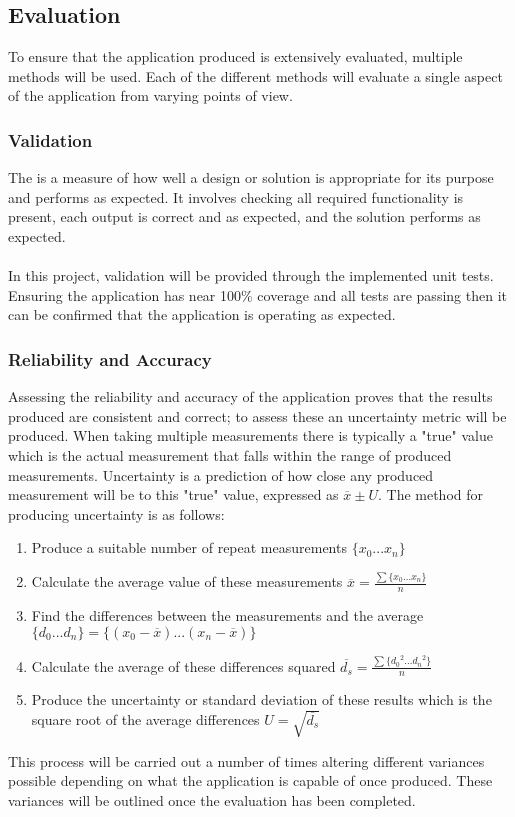 \subsection{Evaluation}
	To ensure that the application produced is extensively evaluated, multiple methods will be used. Each of the different methods will evaluate a single aspect of the application from varying points of view.
	\subsubsection{Validation}
		The is a measure of how well a design or solution is appropriate for its purpose and performs as expected. It involves checking all required functionality is present, each output is correct and as expected, and the solution performs as expected.
		\\\\
		In this project, validation will be provided through the implemented unit tests. Ensuring the application has near 100\% coverage and all tests are passing then it can be confirmed that the application is operating as expected.
	\subsubsection{Reliability and Accuracy}
		Assessing the reliability and accuracy of the application proves that the results produced are consistent and correct; to assess these an uncertainty metric will be produced. When taking multiple measurements there is typically a "true" value which is the actual measurement that falls within the range of produced measurements. Uncertainty is a prediction of how close any produced measurement will be to this "true" value, expressed as $\overline{x} \pm U$. The method for producing uncertainty is as follows:
		\begin{enumerate}
			\item Produce a suitable number of repeat measurements $\{x_0 ... x_n\}$
			\item Calculate the average value of these measurements $\overline{x}=\frac{\sum\{x_0...x_n\}}{n}$
			\item Find the differences between the measurements and the average $\{d_0...d_n\} = \{(x_0-\overline{x})...(x_n-\overline{x})\}$
			\item Calculate the average of these differences squared $\overline{d_s} = \frac{\sum\{{d_0}^2...{d_n}^2\}}{n}$
			\item Produce the uncertainty or standard deviation of these results which is the square root of the average differences $U= \sqrt{\overline{d_s}}$
		\end{enumerate}
		This process will be carried out a number of times altering different variances possible depending on what the application is capable of once produced. These variances will be outlined once the evaluation has been completed.
